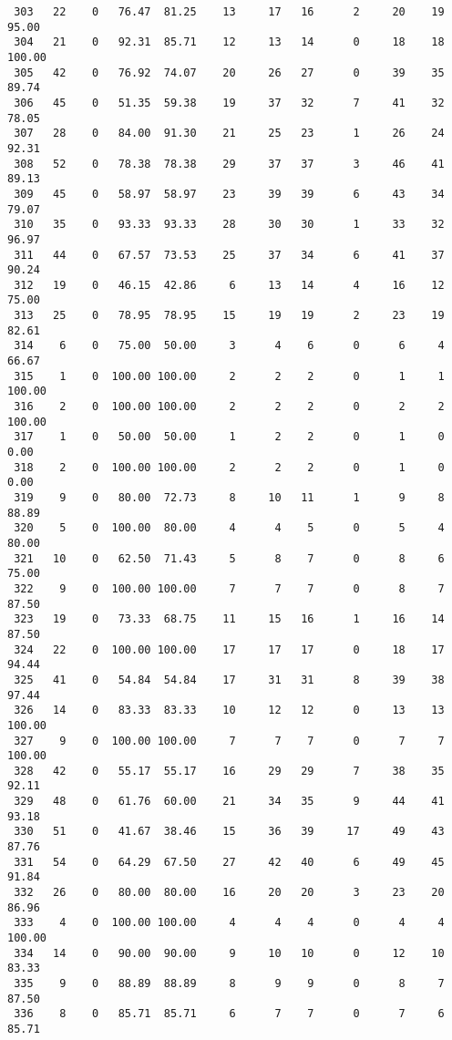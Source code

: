 \begin{verbatim}
 303   22    0   76.47  81.25    13     17   16      2     20    19    95.00
 304   21    0   92.31  85.71    12     13   14      0     18    18   100.00
 305   42    0   76.92  74.07    20     26   27      0     39    35    89.74
 306   45    0   51.35  59.38    19     37   32      7     41    32    78.05
 307   28    0   84.00  91.30    21     25   23      1     26    24    92.31
 308   52    0   78.38  78.38    29     37   37      3     46    41    89.13
 309   45    0   58.97  58.97    23     39   39      6     43    34    79.07
 310   35    0   93.33  93.33    28     30   30      1     33    32    96.97
 311   44    0   67.57  73.53    25     37   34      6     41    37    90.24
 312   19    0   46.15  42.86     6     13   14      4     16    12    75.00
 313   25    0   78.95  78.95    15     19   19      2     23    19    82.61
 314    6    0   75.00  50.00     3      4    6      0      6     4    66.67
 315    1    0  100.00 100.00     2      2    2      0      1     1   100.00
 316    2    0  100.00 100.00     2      2    2      0      2     2   100.00
 317    1    0   50.00  50.00     1      2    2      0      1     0     0.00
 318    2    0  100.00 100.00     2      2    2      0      1     0     0.00
 319    9    0   80.00  72.73     8     10   11      1      9     8    88.89
 320    5    0  100.00  80.00     4      4    5      0      5     4    80.00
 321   10    0   62.50  71.43     5      8    7      0      8     6    75.00
 322    9    0  100.00 100.00     7      7    7      0      8     7    87.50
 323   19    0   73.33  68.75    11     15   16      1     16    14    87.50
 324   22    0  100.00 100.00    17     17   17      0     18    17    94.44
 325   41    0   54.84  54.84    17     31   31      8     39    38    97.44
 326   14    0   83.33  83.33    10     12   12      0     13    13   100.00
 327    9    0  100.00 100.00     7      7    7      0      7     7   100.00
 328   42    0   55.17  55.17    16     29   29      7     38    35    92.11
 329   48    0   61.76  60.00    21     34   35      9     44    41    93.18
 330   51    0   41.67  38.46    15     36   39     17     49    43    87.76
 331   54    0   64.29  67.50    27     42   40      6     49    45    91.84
 332   26    0   80.00  80.00    16     20   20      3     23    20    86.96
 333    4    0  100.00 100.00     4      4    4      0      4     4   100.00
 334   14    0   90.00  90.00     9     10   10      0     12    10    83.33
 335    9    0   88.89  88.89     8      9    9      0      8     7    87.50
 336    8    0   85.71  85.71     6      7    7      0      7     6    85.71

\end{verbatim}
